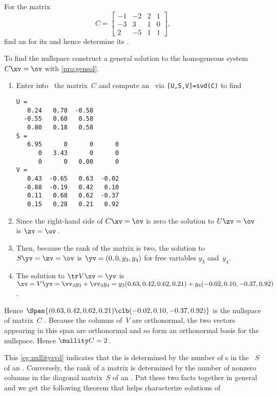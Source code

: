 \begin{example} \label{eg:nullitysvd}
For the matrix
\begin{equation*}
C=\begin{bmatrix} -1&-2&2&1
\\-3&3&1&0
\\2&-5&1&1 \end{bmatrix},
\end{equation*}
find an  for its  and hence determine its .
\begin{solution} 
To find the nullspace construct a general solution to the homogeneous system \(C\xv=\ov\) with \cref{pro:gensol}.
\begin{enumerate}
\item Enter  into \script\ the matrix~\(C\) and compute an \svd\ via \verb|[U,S,V]=svd(C)| to find \twodp
\setbox\ajrqrbox\hbox{}%
\marginajrbox%
\begin{verbatim}
U =
   0.24   0.78  -0.58
  -0.55   0.60   0.58
   0.80   0.18   0.58
S =
   6.95      0      0      0
      0   3.43      0      0
      0      0   0.00      0
V =
   0.43  -0.65   0.63  -0.02
  -0.88  -0.19   0.42   0.10
   0.11   0.68   0.62  -0.37
   0.15   0.28   0.21   0.92
\end{verbatim}
\item Since the right-hand side of \(C\xv=\ov\) is zero the solution to \(U\zv=\ov\) is \(\zv=\ov\)\,.
\item Then, because the rank of the matrix is two, the solution to \(S\yv=\zv=\ov\) is \(\yv=(0,0,y_3,y_4)\) for free variables \(y_3\) and~\(y_4\).
\item The solution to \(\tr V\xv=\yv\) is \(\sloppy\xv=V\yv=\vv_3y_3+\vv_4y_4
=y_3(0.63,0.42,0.62,0.21)+y_4(-0.02,0.10,-0.37,0.92)\).
\end{enumerate}
Hence  \(\Span\{(0.63,0.42,0.62,0.21)\clb (-0.02,0.10,-0.37,0.92)\}\) is the nullspace of matrix~\(C\) \twodp.
Because the columns of~\(V\) are orthonormal, the two vectors appearing in this span are orthonormal and so form an orthonormal basis for the nullspace.
Hence \(\nullity C=2\)\,.
\end{solution}
\end{example}



This \cref{eg:nullitysvd} indicates that the  is determined by the number of s in the ~\(S\) of an \svd.
Conversely, the rank of a matrix is determined by the number of nonzero columns in the diagonal matrix~\(S\) of an \svd.
Put these two facts together in general and we get the following theorem that helps characterize solutions of 





